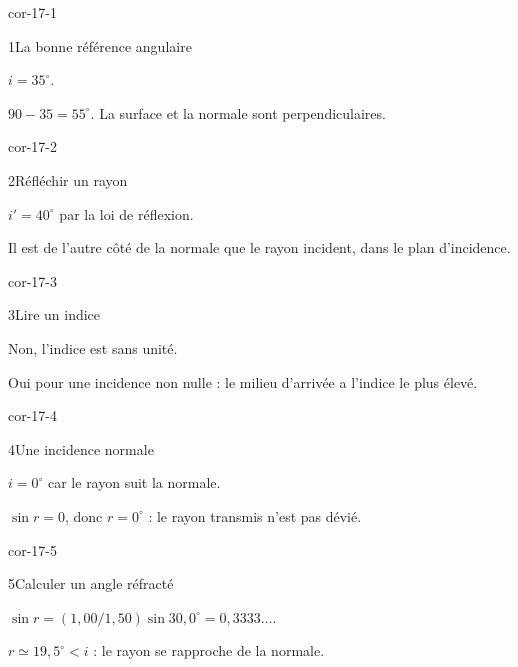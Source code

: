 \clearpage{}
\corrigesSouples
\begin{blocLivre}{cor-17-1}\begin{corrige}{1}{La bonne référence angulaire}
\begin{questions}
\item $i=35^\circ$.
\item $90-35=55^\circ$. La surface et la normale sont perpendiculaires.
\end{questions}
\end{corrige}\end{blocLivre}
\begin{blocLivre}{cor-17-2}\begin{corrige}{2}{Réfléchir un rayon}
\begin{questions}
\item $i'=40^\circ$ par la loi de réflexion.
\item Il est de l’autre côté de la normale que le rayon incident, dans le plan d’incidence.
\end{questions}
\end{corrige}\end{blocLivre}
\begin{blocLivre}{cor-17-3}\begin{corrige}{3}{Lire un indice}
\begin{questions}
\item Non, l’indice est sans unité.
\item Oui pour une incidence non nulle : le milieu d’arrivée a l’indice le plus élevé.
\end{questions}
\end{corrige}\end{blocLivre}
\begin{blocLivre}{cor-17-4}\begin{corrige}{4}{Une incidence normale}
\begin{questions}
\item $i=0^\circ$ car le rayon suit la normale.
\item $\sin r=0$, donc $r=0^\circ$ : le rayon transmis n’est pas dévié.
\end{questions}
\end{corrige}\end{blocLivre}
\begin{blocLivre}{cor-17-5}\begin{corrige}{5}{Calculer un angle réfracté}
\begin{questions}
\item $\sin r=(1,00/1,50)\sin30,0^\circ=0,3333\ldots$.
\item $r\simeq19,5^\circ<i$ : le rayon se rapproche de la normale.
\end{questions}
\end{corrige}\end{blocLivre}
